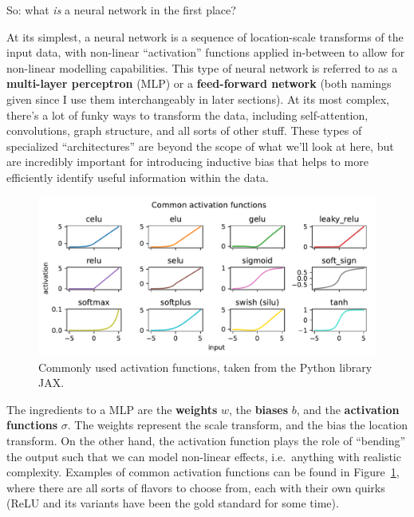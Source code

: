 \documentclass[
  11pt,
  numbers=noendperiod]{book}
\begin{document}
So: what \emph{is} a neural network in the first place?

At its simplest, a neural network is a sequence of location-scale
transforms of the input data, with non-linear ``activation'' functions
applied in-between to allow for non-linear modelling capabilities. This
type of neural network is referred to as a \textbf{multi-layer
perceptron} (MLP) or a \textbf{feed-forward network} (both namings given
since I use them interchangeably in later sections). At its most complex,
there's a lot of funky ways to transform the data, including
self-attention, convolutions, graph structure, and all sorts of other
stuff. These types of specialized ``architectures'' are beyond the scope
of what we'll look at here, but are incredibly important for introducing
inductive bias that helps to more efficiently identify useful
information within the data.

\begin{figure}

{\centering \includegraphics{./ml_files/figure-pdf/fig-activations-output-1.pdf}

}

\caption{\label{fig-activations}Commonly used activation functions,
taken from the Python library JAX.}

\end{figure}

The ingredients to a MLP are the \textbf{weights} \(w\), the
\textbf{biases} \(b\), and the \textbf{activation functions} \(\sigma\).
The weights represent the scale transform, and the bias the location
transform. On the other hand, the activation function plays the role of
``bending'' the output such that we can model non-linear effects,
i.e.~anything with realistic complexity. Examples of common activation
functions can be found in Figure~\ref{fig-activations}, where there are
all sorts of flavors to choose from, each with their own quirks (ReLU
and its variants have been the gold standard for some time).
\end{document}
